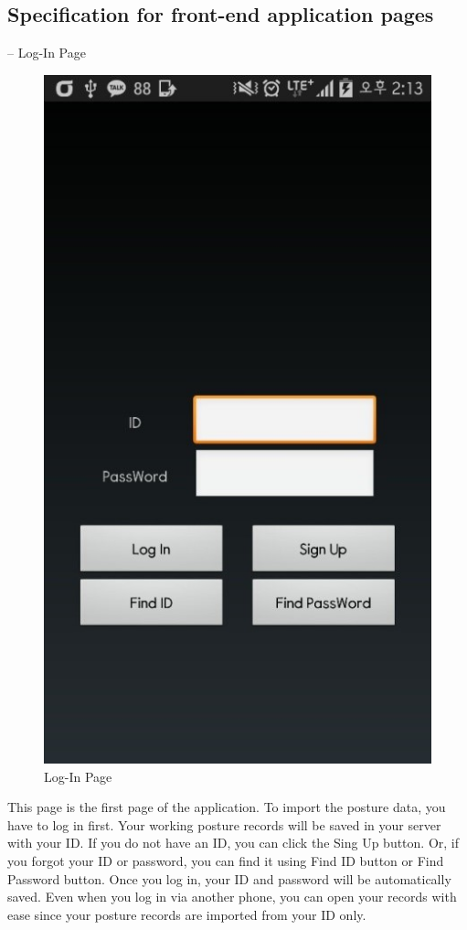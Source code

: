 \documentclass[conference]{IEEEtran}
\begin{document}
\subsection{Specification for front-end application pages\\}



 --	Log-In Page\\

\begin{figure}[h]
\begin{center}
    \includegraphics[scale=1]{img_10}
    \caption{Log-In Page} 
\end{center}
\end{figure}

 This page is the first page of the application. To import the posture data, you have to log in first. Your working posture records will be saved in your server with your ID. If you do not have an ID, you can click the Sing Up  button. Or, if you forgot your ID or password, you can find it using Find ID button or Find Password button. Once you log in, your ID and password will be automatically saved. Even when you log in via another phone, you can  open your records with ease since your posture records are imported from your ID only.\\
\end{document}
